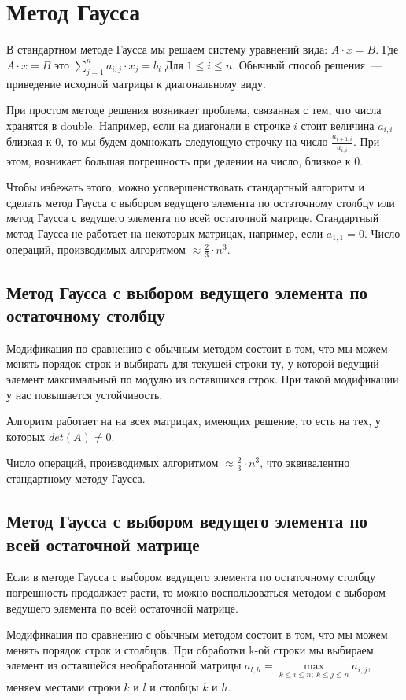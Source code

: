 \documentclass[../../report.tex]{subfiles}
\begin{document}
\chapter{Метод Гаусса}

В стандартном методе Гаусса мы решаем систему уравнений вида: $A \cdot x = B$.
Где $A \cdot x = B$ это
$\sum \limits_{j = 1}^{n} a_{i,j} \cdot x_j = b_i$ Для $1 \le i \le n$.
Обычный способ решения~--- приведение исходной матрицы к диагональному виду.

При простом методе решения возникает проблема, связанная с тем, что числа хранятся в double. Например, если на диагонали в строчке $i$ стоит величина $a_{i,i}$ близкая к $0$, то мы будем домножать следующую строчку на число $\frac{a_{i+1,i}}{a_{i,i}}$. При этом, возникает большая погрешность при делении на число, близкое к $0$.

Чтобы избежать этого, можно усовершенствовать стандартный алгоритм и сделать метод Гаусса с выбором ведущего элемента по остаточному столбцу или метод Гаусса с ведущего элемента по всей остаточной матрице.
Стандартный метод Гаусса не работает на некоторых матрицах, например, если $a_{1,1} = 0$.
Число операций, производимых алгоритмом $\approx \frac{2}{3} \cdot n^3$.

\section{Метод Гаусса с выбором ведущего элемента по остаточному столбцу}
Модификация по сравнению с обычным методом состоит в том, что мы можем менять порядок строк и выбирать для текущей строки ту, у которой ведущий элемент максимальный по модулю из оставшихся строк.
При такой модификации у нас повышается устойчивость.

Алгоритм работает на на всех матрицах, имеющих решение, то есть на тех, у которых $det(A) \neq 0$.

Число операций, производимых алгоритмом $\approx \frac{2}{3} \cdot n^3$, что эквивалентно стандартному методу Гаусса.

\section{Метод Гаусса с выбором ведущего элемента по всей остаточной матрице}
Если в методе Гаусса с выбором ведущего элемента по остаточному столбцу погрешность продолжает расти, то можно воспользоваться методом с выбором ведущего элемента по всей остаточной матрице.

Модификация по сравнению с обычным методом состоит в том, что мы можем менять порядок строк и столбцов. При обработки {k}-ой строки мы выбираем элемент из оставшейся необработанной матрицы $a_{l,h}= \max \limits_{k \le i \le n;~k \le j \le n} a_{i,j}$, меняем местами строки $k$ и $l$ и столбцы $k$ и $h$.
\end{document}
